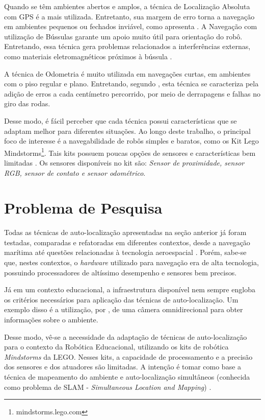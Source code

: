 	Quando se têm ambientes abertos e amplos, a técnica de Localização Absoluta com GPS é a mais utilizada. Entretanto, sua margem de erro torna a navegação em ambientes pequenos ou fechados inviável, como apresenta \cite{roboBulldozerIV}. A Navegação com utilização de Bússulas garante um apoio muito útil para orientação do robô. Entretando, essa técnica gera problemas relacionados a interferências externas, como materiais eletromagnéticos próximos à bússula \cite{roboBulldozerIV}.
	
	A técnica de Odometria é muito utilizada em navegações curtas, em ambientes com o piso regular e plano. Entretando, segundo \cite{roboBulldozerIV}, esta técnica se caracteriza pela adição de erros a cada centímetro percorrido, por meio de derrapagens e falhas no giro das rodas. 

	Desse modo, é fácil perceber que cada técnica possui características que se adaptam melhor para diferentes situações. Ao longo deste trabalho, o principal foco de interesse é a navegabilidade de robôs simples e baratos, como os Kit Lego Mindstorms\footnote{mindstorms.lego.com}. Tais kits possuem poucas opções de sensores e características bem limitadas \cite{drawLegoRobot}. Os sensores disponíveis no kit são: \textit{Sensor de proximidade, sensor RGB, sensor de contato e sensor odométrico}.

\section{Problema de Pesquisa}

	Todas as técnicas de auto-localização apresentadas na seção anterior já foram testadas, comparadas e refatoradas em diferentes contextos, desde a navegação marítima até questões relacionadas à tecnologia aeroespacial \cite{localizacaoEMapeamentoPaulo}. Porém, sabe-se que, nestes contextos, o \textit{hardware} utilizado para navegação era de alta tecnologia, possuindo processadores de altíssimo desempenho e sensores bem precisos.

	Já em um contexto educacional, a infraestrutura disponível nem sempre engloba os critérios necessários para aplicação das técnicas de auto-localização. Um exemplo disso é a utilização, por \cite{localizacaoEMapeamentoPaulo}, de uma câmera omnidirecional para obter informações sobre o ambiente.

	Desse modo, vê-se a necessidade da adaptação de técnicas de auto-localização para o contexto da Robótica Educacional, utilizando os kits de robótica \textit{Mindstorms} da LEGO. Nesses kits, a capacidade de processamento e a precisão dos sensores e dos atuadores são limitadas. A intenção é tomar como base a técnica de mapeamento do ambiente e auto-localização simultâneos (conhecida como problema de SLAM - \textit{Simultaneous Location and Mapping}) \cite{slamProblem}.

